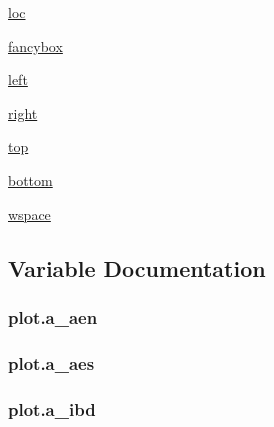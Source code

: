 \begin{DoxyCompactItemize}
\item 
\hyperlink{namespaceplot_ab498c44b7a7bd580f184bac89e46f3d9}{loc}
\item 
\hyperlink{namespaceplot_a79124c49aa5aed509a4cf9e33923c43d}{fancybox}
\item 
\hyperlink{namespaceplot_a0e9b46b90763576a3f1df73c6c39ce72}{left}
\item 
\hyperlink{namespaceplot_a1d2cb03f2431337863e895a8d03c675f}{right}
\item 
\hyperlink{namespaceplot_afdc47b74cc2a1a80adf04ec90fd069a8}{top}
\item 
\hyperlink{namespaceplot_a797f09afab8536fdcab24c9bdbe18eab}{bottom}
\item 
\hyperlink{namespaceplot_a68b096c0350b26a921a31f6225553b71}{wspace}
\end{DoxyCompactItemize}


\subsection{Variable Documentation}
\subsubsection[{\texorpdfstring{a\+\_\+aen}{a_aen}}]{\setlength{\rightskip}{0pt plus 5cm}plot.\+a\+\_\+aen}\hypertarget{namespaceplot_a7f4c760de84443578f19f7bf9c241eaa}{}\label{namespaceplot_a7f4c760de84443578f19f7bf9c241eaa}
\subsubsection[{\texorpdfstring{a\+\_\+aes}{a_aes}}]{\setlength{\rightskip}{0pt plus 5cm}plot.\+a\+\_\+aes}\hypertarget{namespaceplot_a6f3becbff8fd0390f02b94adb898f430}{}\label{namespaceplot_a6f3becbff8fd0390f02b94adb898f430}
\subsubsection[{\texorpdfstring{a\+\_\+ibd}{a_ibd}}]{\setlength{\rightskip}{0pt plus 5cm}plot.\+a\+\_\+ibd}\hypertarget{namespaceplot_a772a7d8604bf7fa83343f51335aee484}{}\label{namespaceplot_a772a7d8604bf7fa83343f51335aee484}
